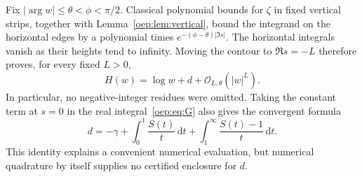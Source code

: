 \documentclass[11pt,letterpaper]{article}
\theoremstyle{remark}\newtheorem{remark}[theorem]{Remark}
\newcommand{\dd}{\,\mathrm d}
\newcommand{\OO}{\mathcal O}
\begin{document}
Fix $|\arg w|\leq\theta<\phi<\pi/2$. Classical polynomial bounds for $\zeta$ in fixed vertical strips, together with Lemma~\ref{oep:lem:vertical}, bound the integrand on the horizontal edges by a polynomial times $e^{-(\phi-\theta)|\Im s|}$. The horizontal integrals vanish as their heights tend to infinity. Moving the contour to $\Re s=-L$ therefore proves, for every fixed $L>0$,
\begin{equation}\label{oep:eq:Hflat}
 H(w)=\log w+d+\OO_{L,\theta}(|w|^L).
\end{equation}
In particular, no negative-integer residues were omitted. Taking the constant term at $s=0$ in the real integral~\eqref{oep:eq:G} also gives the convergent formula
\begin{equation}\label{oep:eq:dquadrature}
 d=-\gamma+\int_0^1\frac{S(t)}t\dd t
                 +\int_1^\infty\frac{S(t)-1}t\dd t.
\end{equation}
This identity explains a convenient numerical evaluation, but numerical quadrature by itself supplies no certified enclosure for $d$.
\end{document}
